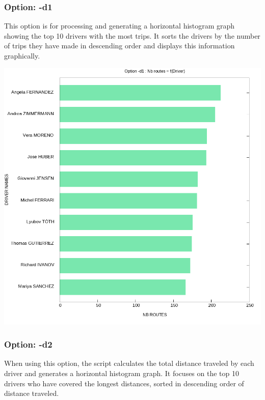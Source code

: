 \documentclass[11pt]{article}
\begin{document}
\subsubsection*{Option: \color{blue}-d1}

This option is for processing and generating a horizontal histogram graph showing the top 10 drivers with the most trips. It sorts the drivers by the number of trips they have made in descending order and displays this information graphically.

\vspace*{\fill}
\begin{center}
    \includegraphics[width=\textwidth]{d1_graph.png}
\end{center}
\vspace*{\fill}

\newpage
\subsubsection*{Option: \color{blue}-d2}
When using this option, the script calculates the total distance traveled by each driver and generates a horizontal histogram graph. It focuses on the top 10 drivers who have covered the longest distances, sorted in descending order of distance traveled.
\end{document}
